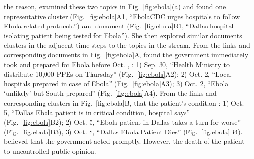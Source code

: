  the reason,  examined these two topics in Fig.~\ref{fig:ebola}(a) and found one representative cluster (Fig.~\ref{fig:ebola}A1, ``EbolaCDC urges hospitals to follow Ebola-related protocols'') and document (Fig.~\ref{fig:ebola}B1, ``Dallas hospital isolating patient being tested for Ebola'').
She then explored similar documents  clusters in the adjacent time steps to   the topics in the stream.
From the links and corresponding documents in Fig.~\ref{fig:ebola}A,  found  the government immediately took  and prepared for Ebola before Oct. , : 1) Sep. 30, ``Health Ministry to distribute 10,000 PPEs on Thursday'' (Fig.~\ref{fig:ebola}A2); 2) Oct. 2, ``Local hospitals prepared in case of Ebola'' (Fig.~\ref{fig:ebola}A3);  3) Oct. 2, ``Ebola `unlikely' but South prepared'' (Fig.~\ref{fig:ebola}A4).
From the links and corresponding clusters in Fig.~\ref{fig:ebola}B,  that the patient's condition : 1) Oct. 5, ``Dallas Ebola patient is in critical condition, hospital says'' (Fig.~\ref{fig:ebola}B2); 2) Oct. 5, ``Ebola patient in Dallas takes a turn for worse'' (Fig.~\ref{fig:ebola}B3);  3) Oct. 8, ``Dallas Ebola Patient Dies'' (Fig.~\ref{fig:ebola}B4).
 believed that the government acted promptly.
However, the death of the patient
 to uncontrolled public opinion.

